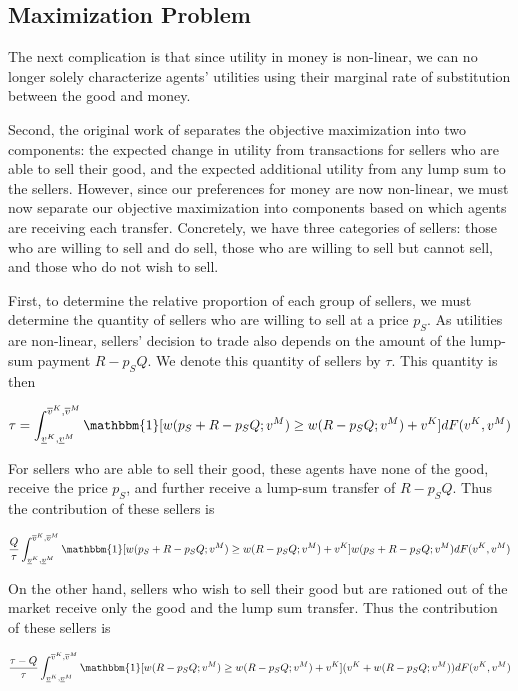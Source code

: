 \documentclass[AER]{AEA}
\begin{document}
\subsection{Maximization Problem}

The next complication is that since utility in money is non-linear, we can no longer solely characterize agents' utilities using their marginal rate of substitution between the good and money.

Second, the original work of \cite{dworczak-2020} separates the objective maximization into two components: the expected change in utility from transactions for sellers who are able to sell their good, and the expected additional utility from any lump sum to the sellers. However, since our preferences for money are now non-linear, we must now separate our objective maximization into components based on which agents are receiving each transfer. Concretely, we have three categories of sellers: those who are willing to sell and do sell, those who are willing to sell but cannot sell, and those who do not wish to sell.

First, to determine the relative proportion of each group of sellers, we must determine the quantity of sellers who are willing to sell at a price $p_S$. As utilities are non-linear, sellers' decision to trade also depends on the amount of the lump-sum payment $R - p_S Q$. We denote this quantity of sellers by $\tau$. This quantity is then

$$
\tau = \int_{\underline{v}^K, \underline{v}^M}^{\overline{v}^K, \overline{v}^M} \mathbbm{1}[w(p_S + R - p_SQ; v^M) \ge w(R - p_S Q ; v^M) + v^K] dF(v^K, v^M)
$$

For sellers who are able to sell their good, these agents have none of the good, receive the price $p_S$, and further receive a lump-sum transfer of $R - p_S Q$. Thus the contribution of these sellers is

\begin{equation}
    \frac{Q}{\tau} \int_{\underline{v}^K, \underline{v}^M}^{\overline{v}^K, \overline{v}^M} \mathbbm{1}[w(p_S + R - p_SQ; v^M) \ge w(R - p_S Q ; v^M) + v^K] w(p_S + R - p_SQ; v^M) dF(v^K, v^M)
\end{equation}

On the other hand, sellers who wish to sell their good but are rationed out of the market receive only the good and the lump sum transfer. Thus the contribution of these sellers is

\begin{equation}
    \frac{\tau - Q}{\tau} \int_{\underline{v}^K, \underline{v}^M}^{\overline{v}^K, \overline{v}^M} \mathbbm{1}[w(R - p_SQ; v^M) \ge w(R - p_S Q ; v^M) + v^K] (v^K + w(R - p_SQ; v^M)) dF(v^K, v^M)
\end{equation}
\end{document}
